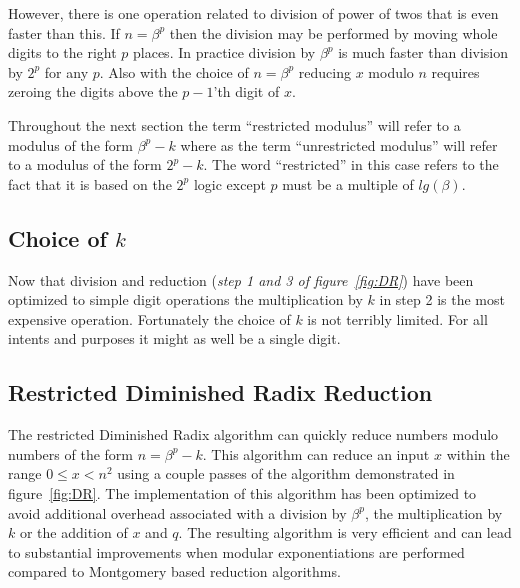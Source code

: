 \documentclass[b5paper]{book}
\begin{document}
However, there is one operation related to division of power of twos that is even faster than this.  If $n = \beta^p$ then the division may be 
performed by moving whole digits to the right $p$ places.  In practice division by $\beta^p$ is much faster than division by $2^p$ for any $p$.  
Also with the choice of $n = \beta^p$ reducing $x$ modulo $n$ requires zeroing the digits above the $p-1$'th digit of $x$.  

Throughout the next section the term ``restricted modulus'' will refer to a modulus of the form $\beta^p - k$ where as the term ``unrestricted
modulus'' will refer to a modulus of the form $2^p - k$.  The word ``restricted'' in this case refers to the fact that it is based on the 
$2^p$ logic except $p$ must be a multiple of $lg(\beta)$.  

\subsection{Choice of $k$}
Now that division and reduction (\textit{step 1 and 3 of figure~\ref{fig:DR}}) have been optimized to simple digit operations the multiplication by $k$
in step 2 is the most expensive operation.  Fortunately the choice of $k$ is not terribly limited.  For all intents and purposes it might
as well be a single digit.  

\subsection{Restricted Diminished Radix Reduction}
The restricted Diminished Radix algorithm can quickly reduce numbers modulo numbers of the form $n = \beta^p - k$.  This algorithm can reduce 
an input $x$ within the range $0 \le x < n^2$ using a couple passes of the algorithm demonstrated in figure~\ref{fig:DR}.  The implementation
of this algorithm has been optimized to avoid additional overhead associated with a division by $\beta^p$, the
multiplication by $k$ or the addition of $x$ and $q$.  The resulting algorithm is very efficient and can lead to substantial improvements when
modular exponentiations are performed compared to Montgomery based reduction algorithms.  
\end{document}
